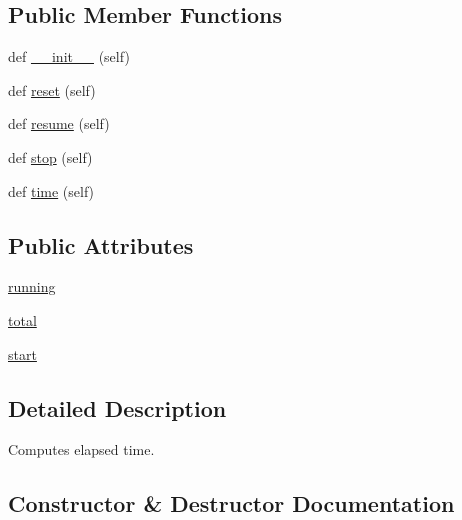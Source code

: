 \subsection*{Public Member Functions}
\begin{DoxyCompactItemize}
\item 
def \hyperlink{classparlai_1_1utils_1_1misc_1_1Timer_ae566c74592910671655a53eafaf8f92d}{\+\_\+\+\_\+init\+\_\+\+\_\+} (self)
\item 
def \hyperlink{classparlai_1_1utils_1_1misc_1_1Timer_a68bdf8abb3fe00edc639b21944d03371}{reset} (self)
\item 
def \hyperlink{classparlai_1_1utils_1_1misc_1_1Timer_a855f1e8a3ba03fe16712fd7ae49dab46}{resume} (self)
\item 
def \hyperlink{classparlai_1_1utils_1_1misc_1_1Timer_a5a7a90c124ef1b1b92a550606a3c93b9}{stop} (self)
\item 
def \hyperlink{classparlai_1_1utils_1_1misc_1_1Timer_a37214d0006ae44a19081c21a5a699ffb}{time} (self)
\end{DoxyCompactItemize}
\subsection*{Public Attributes}
\begin{DoxyCompactItemize}
\item 
\hyperlink{classparlai_1_1utils_1_1misc_1_1Timer_a05abf50b49c1e26baabe03a9daafa870}{running}
\item 
\hyperlink{classparlai_1_1utils_1_1misc_1_1Timer_a37214900a663640b33bdce9e6b3053dd}{total}
\item 
\hyperlink{classparlai_1_1utils_1_1misc_1_1Timer_a1c32e2a8785377c980bc4b125fe6db0d}{start}
\end{DoxyCompactItemize}


\subsection{Detailed Description}
\begin{DoxyVerb}Computes elapsed time.
\end{DoxyVerb}
 

\subsection{Constructor \& Destructor Documentation}
\mbox{\label{classparlai_1_1utils_1_1misc_1_1Timer_ae566c74592910671655a53eafaf8f92d}} 
